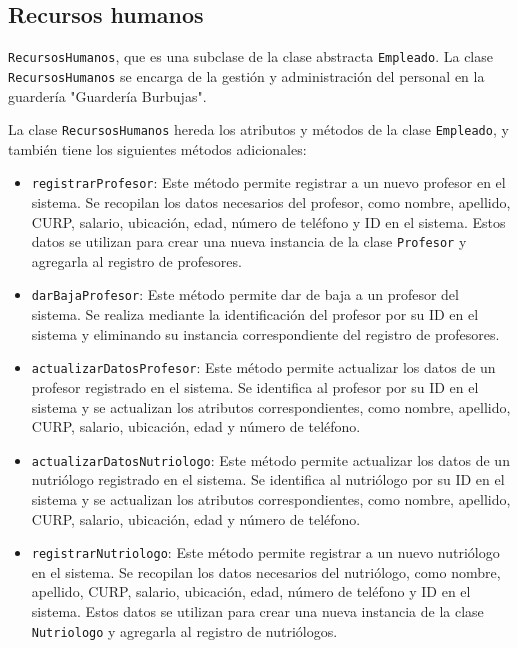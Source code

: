 \clearpage
\subsection{Recursos humanos}

\texttt{RecursosHumanos}, que es una subclase de la clase abstracta \texttt{Empleado}. La clase \texttt{RecursosHumanos} se encarga de la gestión y administración del personal en la guardería "Guardería Burbujas".

La clase \texttt{RecursosHumanos} hereda los atributos y métodos de la clase \texttt{Empleado}, y también tiene los siguientes métodos adicionales:

\begin{itemize}
\item \texttt{registrarProfesor}: Este método permite registrar a un nuevo profesor en el sistema. Se recopilan los datos necesarios del profesor, como nombre, apellido, CURP, salario, ubicación, edad, número de teléfono y ID en el sistema. Estos datos se utilizan para crear una nueva instancia de la clase \texttt{Profesor} y agregarla al registro de profesores.

\item \texttt{darBajaProfesor}: Este método permite dar de baja a un profesor del sistema. Se realiza mediante la identificación del profesor por su ID en el sistema y eliminando su instancia correspondiente del registro de profesores.

\item \texttt{actualizarDatosProfesor}: Este método permite actualizar los datos de un profesor registrado en el sistema. Se identifica al profesor por su ID en el sistema y se actualizan los atributos correspondientes, como nombre, apellido, CURP, salario, ubicación, edad y número de teléfono.

\item \texttt{actualizarDatosNutriologo}: Este método permite actualizar los datos de un nutriólogo registrado en el sistema. Se identifica al nutriólogo por su ID en el sistema y se actualizan los atributos correspondientes, como nombre, apellido, CURP, salario, ubicación, edad y número de teléfono.

\item \texttt{registrarNutriologo}: Este método permite registrar a un nuevo nutriólogo en el sistema. Se recopilan los datos necesarios del nutriólogo, como nombre, apellido, CURP, salario, ubicación, edad, número de teléfono y ID en el sistema. Estos datos se utilizan para crear una nueva instancia de la clase \texttt{Nutriologo} y agregarla al registro de nutriólogos.


\end{itemize}
